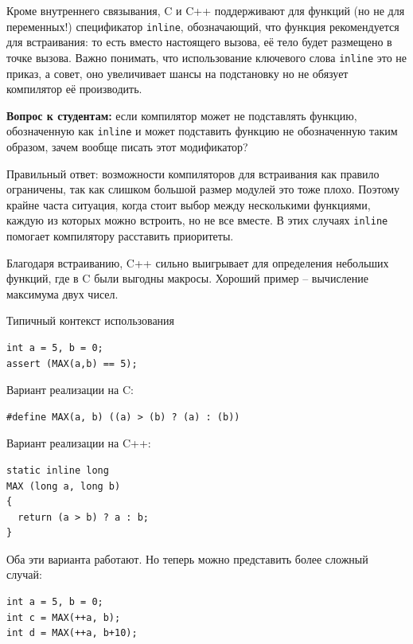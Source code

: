 \documentclass[a4paper,12pt,oneside]{article}
\newif\ifanswers
\begin{document}
Кроме внутреннего связывания, C и C++ поддерживают для функций (но не для переменных!) спецификатор \lstinline!inline!, обозначающий, что функция рекомендуется для встраивания: то есть вместо настоящего вызова, её тело будет размещено в точке вызова. Важно понимать, что использование ключевого слова \lstinline!inline! это не приказ, а совет, оно увеличивает шансы на подстановку но не обязует компилятор её производить.

\textbf{Вопрос к студентам:} если компилятор может не подставлять функцию, обозначенную как \lstinline!inline! и может подставить функцию не обозначенную таким образом, зачем вообще писать этот модификатор?

\ifanswers
Возможный ответ: \lstinline!inline! позволяет определение функции в каждом модуле (но увы это можно парировать тем, что для этого есть \lstinline!static!)
\fi

Правильный ответ: возможности компиляторов для встраивания как правило ограничены, так как слишком большой размер модулей это тоже плохо. Поэтому крайне часта ситуация, когда стоит выбор между несколькими функциями, каждую из которых можно встроить, но не все вместе. В этих случаях \lstinline!inline! помогает компилятору расставить приоритеты.

Благодаря встраиванию, C++ сильно выигрывает для определения небольших функций, где в C были выгодны макросы. Хороший пример -- вычисление максимума двух чисел.

Типичный контекст использования

\begin{lstlisting}
int a = 5, b = 0;
assert (MAX(a,b) == 5);
\end{lstlisting}

Вариант реализации на C:

\begin{lstlisting}
#define MAX(a, b) ((a) > (b) ? (a) : (b))
\end{lstlisting}

Вариант реализации на C++:

\begin{lstlisting}
static inline long
MAX (long a, long b)
{
  return (a > b) ? a : b;
} 
\end{lstlisting}

Оба эти варианта работают. Но теперь можно представить более сложный случай:

\begin{lstlisting}
int a = 5, b = 0;
int c = MAX(++a, b);
int d = MAX(++a, b+10);
\end{lstlisting}
\end{document}
